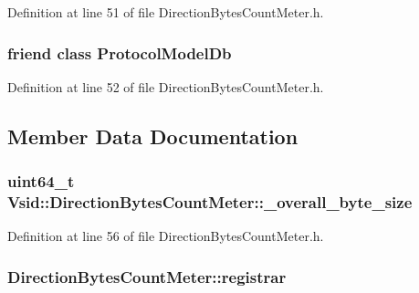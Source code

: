 Definition at line 51 of file Direction\-Bytes\-Count\-Meter.\-h.

\hypertarget{class_vsid_1_1_direction_bytes_count_meter_a3c0d389e7a9476b06313d8fb9ca9fe68}{
\subsubsection[{Protocol\-Model\-Db}]{\setlength{\rightskip}{0pt plus 5cm}friend class {\bf Protocol\-Model\-Db}\hspace{0.3cm}{\ttfamily [friend]}}}\label{class_vsid_1_1_direction_bytes_count_meter_a3c0d389e7a9476b06313d8fb9ca9fe68}


Definition at line 52 of file Direction\-Bytes\-Count\-Meter.\-h.



\subsection{Member Data Documentation}
\hypertarget{class_vsid_1_1_direction_bytes_count_meter_aabfb4d08acf97bcc1ac0f97b01fd9685}{
\subsubsection[{\-\_\-overall\-\_\-byte\-\_\-size}]{\setlength{\rightskip}{0pt plus 5cm}uint64\-\_\-t Vsid\-::\-Direction\-Bytes\-Count\-Meter\-::\-\_\-overall\-\_\-byte\-\_\-size\hspace{0.3cm}{\ttfamily [protected]}}}\label{class_vsid_1_1_direction_bytes_count_meter_aabfb4d08acf97bcc1ac0f97b01fd9685}


Definition at line 56 of file Direction\-Bytes\-Count\-Meter.\-h.

\hypertarget{class_vsid_1_1_direction_bytes_count_meter_a15ee270ef7ea1977a3a2e246d6adecdd}{
\subsubsection[{registrar}]{ Direction\-Bytes\-Count\-Meter\-::registrar\hspace{0.3cm}{\ttfamily [static]}}}\label{class_vsid_1_1_direction_bytes_count_meter_a15ee270ef7ea1977a3a2e246d6adecdd}


